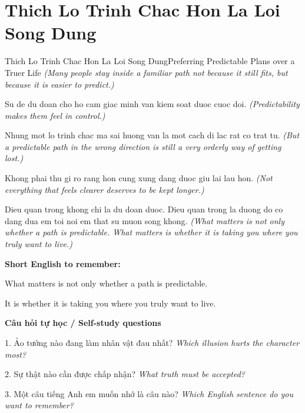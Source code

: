 \section{Thich Lo Trinh Chac Hon La Loi Song Dung}
\begin{truyen}{Thich Lo Trinh Chac Hon La Loi Song Dung}{Preferring Predictable Plans over a Truer Life}
\textit{(Many people stay inside a familiar path not because it still fits, but because it is easier to predict.)}

Su de du doan cho ho cam giac minh van kiem soat duoc cuoc doi.
\textit{(Predictability makes them feel in control.)}

Nhung mot lo trinh chac ma sai huong van la mot cach di lac rat co trat tu.
\textit{(But a predictable path in the wrong direction is still a very orderly way of getting lost.)}

Khong phai thu gi ro rang hon cung xung dang duoc giu lai lau hon.
\textit{(Not everything that feels clearer deserves to be kept longer.)}

\end{truyen}

\begin{baihoc}
Dieu quan trong khong chi la du doan duoc. Dieu quan trong la duong do co dang dua em toi noi em that su muon song khong.
\textit{(What matters is not only whether a path is predictable. What matters is whether it is taking you where you truly want to live.)}
\end{baihoc}

\begin{ghinhoanh}
\textbf{Short English to remember:}

What matters is not only whether a path is predictable.

It is whether it is taking you where you truly want to live.

\end{ghinhoanh}

\begin{tuhocnhanh}
\textbf{Câu hỏi tự học / Self-study questions}

1. Ảo tưởng nào đang làm nhân vật đau nhất? \textit{Which illusion hurts the character most?}

2. Sự thật nào cần được chấp nhận? \textit{What truth must be accepted?}

3. Một câu tiếng Anh em muốn nhớ là câu nào? \textit{Which English sentence do you want to remember?}
\end{tuhocnhanh}
\ngancach

